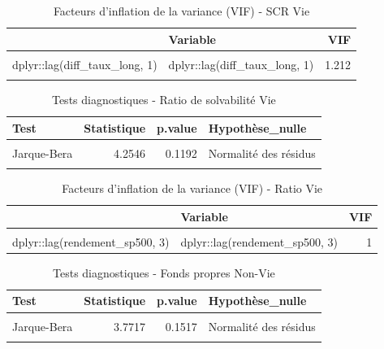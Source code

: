 \documentclass[
]{article}
\begin{document}
\begin{longtable}[t]{llr}
\caption{\label{tab:unnamed-chunk-51}Facteurs d'inflation de la variance (VIF) - SCR Vie}\\
\toprule
 & Variable & VIF\\
\midrule
\cellcolor{gray!10}{dplyr::lag(diff\_scr, 1)} & \cellcolor{gray!10}{dplyr::lag(diff\_scr, 1)} & \cellcolor{gray!10}{1.054}\\
dplyr::lag(diff\_taux\_long, 1) & dplyr::lag(diff\_taux\_long, 1) & 1.212\\
\cellcolor{gray!10}{dplyr::lag(diff\_ipc, 3)} & \cellcolor{gray!10}{dplyr::lag(diff\_ipc, 3)} & \cellcolor{gray!10}{1.243}\\
\bottomrule
\end{longtable}

\begin{longtable}[t]{lrrl}
\caption{\label{tab:unnamed-chunk-52}Tests diagnostiques - Ratio de solvabilité Vie}\\
\toprule
Test & Statistique & p.value & Hypothèse\_nulle\\
\midrule
\cellcolor{gray!10}{Ljung-Box} & \cellcolor{gray!10}{0.6204} & \cellcolor{gray!10}{0.4309} & \cellcolor{gray!10}{Pas d'autocorrélation}\\
Jarque-Bera & 4.2546 & 0.1192 & Normalité des résidus\\
\cellcolor{gray!10}{Breusch-Pagan} & \cellcolor{gray!10}{3.5422} & \cellcolor{gray!10}{0.1701} & \cellcolor{gray!10}{Homoscédasticité}\\
\bottomrule
\end{longtable}

\begin{longtable}[t]{llr}
\caption{\label{tab:unnamed-chunk-52}Facteurs d'inflation de la variance (VIF) - Ratio Vie}\\
\toprule
 & Variable & VIF\\
\midrule
\cellcolor{gray!10}{dplyr::lag(diff\_ratio, 1)} & \cellcolor{gray!10}{dplyr::lag(diff\_ratio, 1)} & \cellcolor{gray!10}{1}\\
dplyr::lag(rendement\_sp500, 3) & dplyr::lag(rendement\_sp500, 3) & 1\\
\bottomrule
\end{longtable}

\begin{longtable}[t]{lrrl}
\caption{\label{tab:unnamed-chunk-53}Tests diagnostiques - Fonds propres Non-Vie}\\
\toprule
Test & Statistique & p.value & Hypothèse\_nulle\\
\midrule
\cellcolor{gray!10}{Ljung-Box} & \cellcolor{gray!10}{0.3490} & \cellcolor{gray!10}{0.5547} & \cellcolor{gray!10}{Pas d'autocorrélation}\\
Jarque-Bera & 3.7717 & 0.1517 & Normalité des résidus\\
\cellcolor{gray!10}{Breusch-Pagan} & \cellcolor{gray!10}{1.3123} & \cellcolor{gray!10}{0.8593} & \cellcolor{gray!10}{Homoscédasticité}\\
\bottomrule
\end{longtable}
\end{document}
